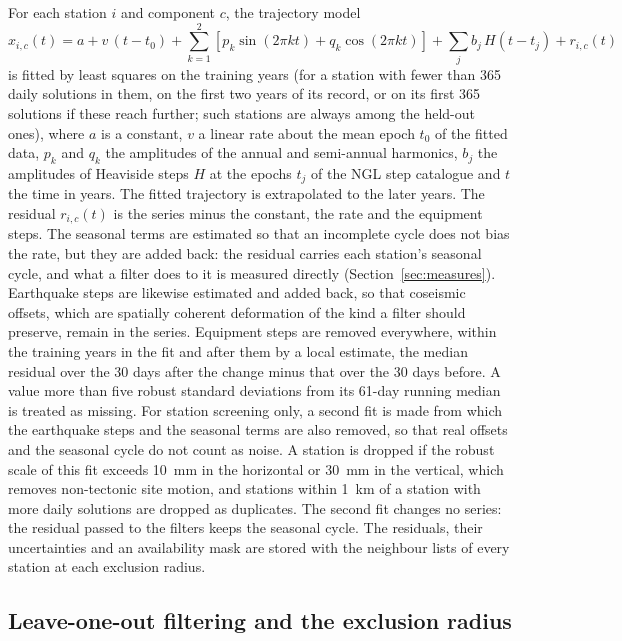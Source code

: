 \documentclass[preprint,12pt,authoryear]{elsarticle}
\begin{document}
For each station $i$ and component $c$, the trajectory model
\begin{equation}
  x_{i,c}(t) = a + v\,(t - t_0) + \sum_{k=1}^{2}\left[p_k \sin(2\pi k t) + q_k \cos(2\pi k t)\right] + \sum_{j} b_j\, H(t - t_j) + r_{i,c}(t)
  \label{eq:trajectory}
\end{equation}
is fitted by least squares on the training years (for a station with fewer than 365 daily solutions in them, on the first two years of its record, or on its first 365 solutions if these reach further; such stations are always among the held-out ones), where $a$ is a constant, $v$ a linear rate about the mean epoch $t_0$ of the fitted data, $p_k$ and $q_k$ the amplitudes of the annual and semi-annual harmonics, $b_j$ the amplitudes of Heaviside steps $H$ at the epochs $t_j$ of the NGL step catalogue and $t$ the time in years. The fitted trajectory is extrapolated to the later years. The residual $r_{i,c}(t)$ is the series minus the constant, the rate and the equipment steps. The seasonal terms are estimated so that an incomplete cycle does not bias the rate, but they are added back: the residual carries each station's seasonal cycle, and what a filter does to it is measured directly (Section~\ref{sec:measures}). Earthquake steps are likewise estimated and added back, so that coseismic offsets, which are spatially coherent deformation of the kind a filter should preserve, remain in the series. Equipment steps are removed everywhere, within the training years in the fit and after them by a local estimate, the median residual over the 30 days after the change minus that over the 30 days before. A value more than five robust standard deviations from its 61-day running median is treated as missing. For station screening only, a second fit is made from which the earthquake steps and the seasonal terms are also removed, so that real offsets and the seasonal cycle do not count as noise. A station is dropped if the robust scale of this fit exceeds 10~mm in the horizontal or 30~mm in the vertical, which removes non-tectonic site motion, and stations within 1~km of a station with more daily solutions are dropped as duplicates. The second fit changes no series: the residual passed to the filters keeps the seasonal cycle. The residuals, their uncertainties and an availability mask are stored with the neighbour lists of every station at each exclusion radius.

\subsection{Leave-one-out filtering and the exclusion radius}
\label{sec:loo}
\end{document}

